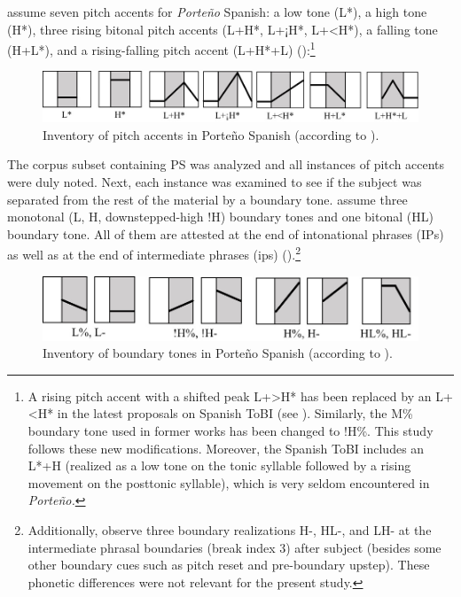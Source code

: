 \documentclass[output=paper]{langsci/langscibook}
\begin{document}
\citet[288–290]{Gabriel2010incollection} assume seven pitch accents for \textit{Porte{\~n}o} Spanish: a low tone (L*), a high tone (H*), three rising bitonal pitch accents (L+H*, L+¡H*, L+<H*), a falling tone (H+L*), and a rising-falling pitch accent (L+H*+L) ():\footnote{A rising pitch accent with a shifted peak L+>H* has been replaced by an L+<H* in the latest proposals on Spanish ToBI (see \citealt{Hualde2015}). Similarly, the M\% boundary tone used in former works has been changed to !H\%. This study follows these new modifications. Moreover, the Spanish ToBI includes an L*+H (realized as a low tone on the tonic syllable followed by a rising movement on the posttonic syllable), which is very seldom encountered in \textit{Porte{\~n}o.}}

  
\begin{figure}[t]
\includegraphics[width=\textwidth]{figures/pes-img1.png}
   \caption{\label{fig:pes:1}Inventory of pitch accents in Porte{\~n}o Spanish (according to \citealt{Gabriel2010incollection}).}
\end{figure}
  
The corpus subset containing PS was analyzed and all instances of pitch accents were duly noted. Next, each instance was examined to see if the subject was separated from the rest of the material by a boundary tone. \citet{Gabriel2010incollection} assume three monotonal (L, H, downstepped-high !H) boundary tones and one bitonal (HL) boundary tone. All of them are attested at the end of intonational phrases (IPs) as well as at the end of intermediate phrases (ips) ().\footnote{Additionally, \citet{Gabriel2011} observe three boundary realizations H-, HL-, and LH- at the intermediate phrasal boundaries (break index 3) after subject (besides some other boundary cues such as pitch reset and pre-boundary upstep). These phonetic differences were not relevant for the present study.
}


\begin{figure}[t]
\includegraphics[width=.8\textwidth]{figures/pes-img2.png} 
  \caption{Inventory of boundary tones in Porte{\~n}o Spanish (according to \citealt{Gabriel2010incollection}).}
  \label{fig:pes:2}
  \end{figure}
  
\end{document}
